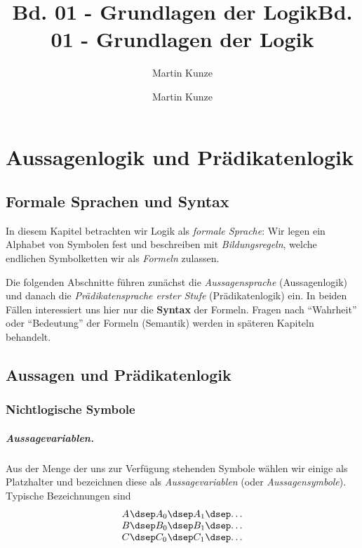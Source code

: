 \documentclass[main.tex]{subfiles}
\title{Bd. 01 - Grundlagen der Logik}
\author{Martin Kunze}
\date{}
\begin{document}
\title{Bd. 01 - Grundlagen der Logik}
\author{Martin Kunze}
\date{}
\hypersetup{pageanchor=false}
\maketitle
\hypersetup{pageanchor=true}
\tableofcontents
\raggedbottom
\setcounter{file}{1}
\renewcommand{\FormulaBandID}{1}

\chapter{Aussagenlogik und Prädikatenlogik}

\section{Formale Sprachen und Syntax}

In diesem Kapitel betrachten wir Logik als \emph{formale Sprache}:
Wir legen ein Alphabet von Symbolen fest und beschreiben mit
\emph{Bildungsregeln}, welche endlichen Symbolketten wir als
\emph{Formeln} zulassen. 

Die folgenden Abschnitte führen zunächst die \emph{Aussagensprache}
(Aussagenlogik) und danach die \emph{Prädikatensprache erster Stufe}
(Prädikatenlogik) ein. In beiden Fällen interessiert uns hier nur
die \textbf{Syntax} der Formeln. Fragen nach \enquote{Wahrheit} oder
\enquote{Bedeutung} der Formeln (Semantik) werden in späteren
Kapiteln behandelt.

\section{Aussagen und Prädikatenlogik}

\subsection{Nichtlogische Symbole}

\paragraph{Aussagevariablen.}
Aus der Menge der uns zur Verfügung stehenden Symbole wählen wir einige
als Platzhalter und bezeichnen diese als \emph{Aussagevariablen}
(oder \emph{Aussagensymbole}). Typische Bezeichnungen sind
\[
\begin{array}{l@{\dsep}l@{\dsep}l@{\dsep}l}
  A & A_0 & A_1 & \dots \\
  B & B_0 & B_1 & \dots \\
  C & C_0 & C_1 & \dots
\end{array}
\]
\end{document}
